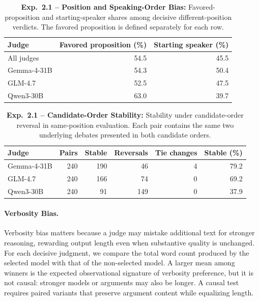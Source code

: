 \documentclass{article}
\begin{document}
\begin{table}[t]
  \centering
  \footnotesize
  \caption{\textbf{Exp.~2.1 -- Position and Speaking-Order Bias:} Favored-proposition and starting-speaker shares among decisive different-position verdicts. The favored proposition is defined separately for each row.}
  \label{tab:current-position-order}
  \begin{tabularx}{\textwidth}{@{}>{\raggedright\arraybackslash}Xrr@{}}
    \toprule
    Judge & Favored proposition (\%) & Starting speaker (\%) \\
    \midrule
    All judges & 54.5 & 45.5 \\
    Gemma-4-31B & 54.3 & 50.4 \\
    GLM-4.7 & 52.5 & 47.5 \\
    Qwen3-30B & 63.0 & 39.7 \\
    \bottomrule
  \end{tabularx}
\end{table}

\begin{table}[t]
  \centering
  \footnotesize
  \setlength{\tabcolsep}{4pt}
  \caption{\textbf{Exp.~2.1 -- Candidate-Order Stability:} Stability under candidate-order reversal in same-position evaluation. Each pair contains the same two underlying debates presented in both candidate orders.}
  \label{tab:current-candidate-order}
  \begin{tabularx}{\textwidth}{@{}>{\raggedright\arraybackslash}Xrrrrr@{}}
    \toprule
    Judge & Pairs & Stable & Reversals & Tie changes & Stable (\%) \\
    \midrule
    Gemma-4-31B & 240 & 190 & 46 & 4 & 79.2 \\
    GLM-4.7 & 240 & 166 & 74 & 0 & 69.2 \\
    Qwen3-30B & 240 & 91 & 149 & 0 & 37.9 \\
    \bottomrule
  \end{tabularx}
\end{table}

\paragraph{Verbosity Bias.}
Verbosity bias matters because a judge may mistake additional text for stronger reasoning, rewarding output length even when substantive quality is unchanged. For each decisive judgment, we compare the total word count produced by the selected model with that of the non-selected model. A larger mean among winners is the expected observational signature of verbosity preference, but it is not causal: stronger models or arguments may also be longer. A causal test requires paired variants that preserve argument content while equalizing length.
\end{document}
